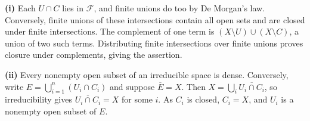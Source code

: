 \textbf{(i)} Each $U\cap C$ lies in $\mathcal{F}$, and finite unions do too by De Morgan's law. Conversely, finite unions of these intersections contain all open sets and are closed under finite intersections. The complement of one term is $(X\setminus U)\cup(X\setminus C)$, a union of two such terms. Distributing finite intersections over finite unions proves closure under complements, giving the assertion.

\textbf{(ii)} Every nonempty open subset of an irreducible space is dense. Conversely, write $E=\bigcup_{i=1}^n(U_i\cap C_i)$ and suppose $\overline{E}=X$. Then $X=\bigcup_i\overline{U_i\cap C_i}$, so irreducibility gives $\overline{U_i\cap C_i}=X$ for some $i$. As $C_i$ is closed, $C_i=X$, and $U_i$ is a nonempty open subset of $E$.
